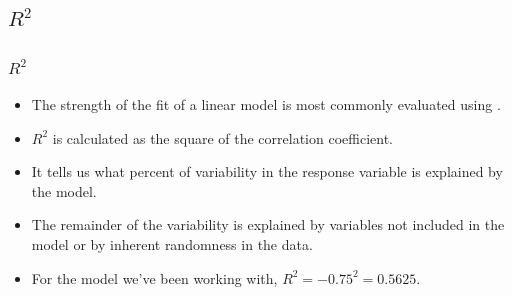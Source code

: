 
\subsection{$R^2$}


\begin{frame}
\frametitle{$R^2$}

\begin{itemize}

\item The strength of the fit of a linear model is most commonly evaluated using .

\pause

\item $R^2$ is calculated as the square of the correlation coefficient.

\pause

\item It tells us what percent of variability in the response variable is explained by the model.

\pause

\item The remainder of the variability is explained by variables not included in the model or by inherent randomness in the data.

\pause

\item For the model we've been working with, $R^2 = -0.75^2 = 0.5625$.

\end{itemize}

\end{frame}


